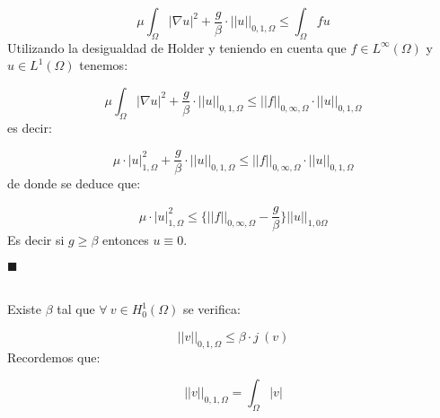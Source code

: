 \begin{displaymath}
\mu \int_{\Omega }|\nabla u|^2 + \frac{g}{\beta}\cdot ||u||_{0,1,\Omega }\le
\int_{\Omega }fu
\end{displaymath}
Utilizando la desigualdad de Holder y teniendo en cuenta que
$f\in L^{\infty } (\Omega )$ y $u\in L^1 (\Omega )$ tenemos:

\begin{displaymath}
\mu \int_{\Omega }|\nabla u|^2+\frac{g}{\beta}\cdot ||u||_{0,1,\Omega }\le
||f||_{0,\infty ,\Omega }\cdot ||u||_{0,1,\Omega }
\end{displaymath}
es decir:

\begin{displaymath}
\mu \cdot |u|^2_{1,\Omega }+\frac{g}{\beta}\cdot ||u||_{0,1,\Omega }\le
||f||_{0,\infty ,\Omega }\cdot ||u||_{0,1,\Omega }
\end{displaymath}
de donde se deduce que:

\begin{displaymath}
\mu \cdot |u|^2_{1,\Omega }\le \{ ||f||_{0,\infty ,\Omega}-\frac{g}{\beta} \}
||u||_{1,0\Omega }
\end{displaymath}
Es decir si $g\ge\beta $ entonces $u\equiv 0$.
\begin{flushright}
$\blacksquare$
\end{flushright}

\begin{lema}
\ \\
Existe $\beta$ tal que $\forall \ v \in H^1_0 (\Omega )$ se verifica:

\begin{displaymath}
||v||_{0,1,\Omega }\le \beta \cdot j\ (v)
\end{displaymath}
Recordemos que:

\begin{displaymath}
||v||_{0,1,\Omega }=\int_{\Omega }|v|
\end{displaymath}
\end{lema}

